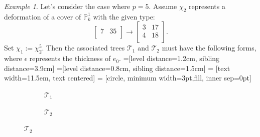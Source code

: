 \documentclass{compositio}
\theoremstyle{remark}
\newtheorem{example}[theorem]{Example}
\theoremstyle{remark}
\begin{document}
\begin{example}
    Let's consider the case where $p=5$. Assume $\chi_2$ represents a deformation of a cover of $\mathbb{P}^1_k$ with the given type:
    \[\begin{bmatrix}
    7 & 35 \\
    \end{bmatrix} \xrightarrow{}  \begin{bmatrix}
   3 & 17 \\
   4 & 18 \\
   \end{bmatrix}. \] 
   Set $\chi_1:=\chi_2^5$. Then the associated trees $\mathcal{T}_1$ and $\mathcal{T}_2$ must have the following forms, where $\epsilon$ represents the thickness of $e_0$.
       =[level distance=1.2cm, sibling distance=3.9cm]
=[level distance=0.8cm, sibling distance=1.5cm]
 = [text width=11.5em, text centered]
 = [circle, minimum width=3pt,fill, inner sep=0pt]
\begin{figure}[ht]
\begin{subfigure}{.5\textwidth}
  \centering
{}
  \caption{$\mathcal{T}_1$}
\end{subfigure}%
\begin{subfigure}{.5\textwidth}
  \centering
{}
  \caption{$\mathcal{T}_2$}
\end{subfigure}%
\end{figure}


\end{example}
\end{document}

